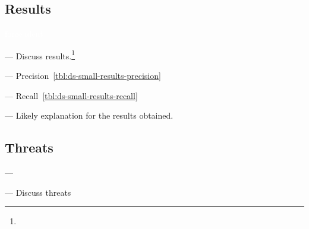 \subsection{Results}
\textcolor{white}{force ident} %


--- Discuss results.\footnote{} \vspace{3mm}



--- Precision~\ref{tbl:ds-small-results-precision}  \vspace{3mm}


--- Recall~\ref{tbl:ds-small-results-recall} \vspace{3mm}

--- Likely explanation for the results obtained.










\subsection{Threats}
\label{cp4:corpus-threats}

---  \vspace{3mm}

--- Discuss threats \vspace{3mm}



